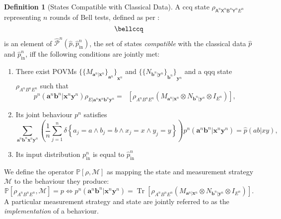 \documentclass[10pt, a4paper]{article}
\numberwithin{equation}{section} %
\newcounter{stmt} %
\theoremstyle{definition}
\newtheorem{defn}[stmt]{Definition}
\theoremstyle{plain}
\newcommand{\?}{\mathrel{?}} %
\newcommand{\cvec}[1]{\boldsymbol{\mathbf{#1}}}    %
\newcommand{\indic}[1]{\delta{\left\{#1\right\}}} %
\newcommand{\Tr}[2][]{\mathop{\mathrm{Tr}#1}\left[ #2 \right]} %
\newcommand{\sM}{\mathcal{M}}
\newcommand{\crv}[1]{\mathsf{#1}}
\newcommand{\compatstates}[3][]{\hat{\mathcal{P}}#1(#2,#3)}
\newcommand{\prin}[1][p]{#1_{\mathrm{in}}}
\newcommand{\behav}[2]{\mathbb{P}\left[#1, #2\right]}
\begin{document}
    \begin{defn}[States Compatible with Classical Data]
    A ccq state \(\rho_{\crv{A}^n\crv{X}^n \crv{B}^n\crv{Y}^n E^n}\) representing \(n\) rounds of Bell tests, defined as per :
    \begin{equation}
      \bellccq
    \end{equation}
  is an element of \(\compatstates[^n]{\hat{p}}{\prin[\hat{p}^n]}\), the set of states \emph{compatible} with the classical data \(\hat{p}\) and \(\prin[\hat{p}^n]\), iff the following conditions are jointly met:
      \begin{enumerate}
        \item There exist POVMs \({\{ {\{ M_{\cvec{a}^n|\cvec{x}^n}\}}_{\cvec{a}^n} \}}_{\cvec{x}^n}\) and \({\{ {\{ N_{\cvec{b}^n|\cvec{y}^n}\}}_{\cvec{b}^n} \}}_{\cvec{y}^n}\) and a qqq state \(\rho_{A^n B^n E^n}\) such that
        \begin{equation}\label{eqn:probmeas}
          p^n(\cvec{a}^n\cvec{b}^n|\cvec{x}^n\cvec{y}^n) \rho_{E|\cvec{a}^n\cvec{x}^n\cvec{b}^n\cvec{y}^n} = \Tr[_{A^n B^n}]{\rho_{A^n B^n E^n} \left(M_{\cvec{a}^n|\cvec{x}^n} \otimes N_{\cvec{b}^n|\cvec{y}^n} \otimes I_{E^n}\right) },
        \end{equation}
        \item Its joint behaviour \(p^n\) satisfies
      \begin{equation}
        \sum_{\cvec{a}^n\cvec{b}^n \cvec{x}^n\cvec{y}^n} \left( \frac{1}{n} \sum_{j=1}^n \indic{a_j = a \land b_j = b \land x_j = x \land y_j = y} \right) p^n(\cvec{a}^n\cvec{b}^n|\cvec{x}^n\cvec{y}^n) = \hat{p}(ab|xy),
      \end{equation}
      \item Its input distribution \(\prin^n\) is equal to \(\prin[\hat{p}^n]\)
  \end{enumerate}
    \end{defn}

    We define the operator \(\behav{\rho}{\sM}\) as mapping the state and measurement strategy \(\sM\) to the behaviour they produce:
    \begin{equation}
      \behav{\rho_{A^n B^n E^n}}{\sM} = p \Leftrightarrow p^n(\cvec{a}^n\cvec{b}^n|\cvec{x}^n\cvec{y}^n) = \Tr{\rho_{A^n B^n E^n} \left(M_{\cvec{a}^n|\cvec{x}^n} \otimes N_{\cvec{b}^n|\cvec{y}^n} \otimes I_{E^n}\right) }.
    \end{equation}
    A particular measurement strategy and state are jointly referred to as the \emph{implementation} of a behaviour.
\end{document}
